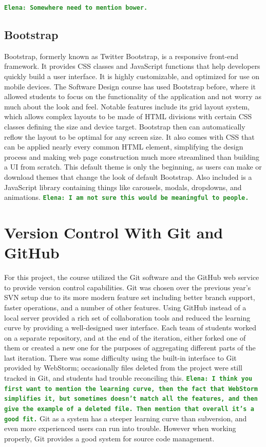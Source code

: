 \documentclass[12pt]{article}
\newcommand{\comment}[1]{{\bf \tt  {#1}}}
\newcommand{\emcomment}[1]{\textcolor{ForestGreen}{\comment{Elena: {#1}}}}
\begin{document}
\emcomment{Somewhere need to mention bower.}

\subsection{Bootstrap}\label{sec:bootstrap}
Bootstrap, formerly known as Twitter Bootstrap, is a responsive front-end framework. It provides CSS classes and JavaScript functions that help developers quickly build a user interface. It is highly customizable, and optimized for use on mobile devices. The Software Design course has used Bootstrap before, where it allowed students to focus on the functionality of the application and not worry as much about the look and feel. Notable features include its grid layout system, which allows complex layouts to be made of HTML divisions with certain CSS classes defining the size and device target. Bootstrap then can automatically reflow the layout to be optimal for any screen size. It also comes with CSS that can be applied nearly every common HTML element, simplifying the design process and making web page construction much more streamlined than building a UI from scratch. This default theme is only the beginning, as users can make or download themes that change the look of default Bootstrap. Also included is a JavaScript library containing things like carousels, modals, dropdowns, and animations. \emcomment{I am not sure this would be meaningful to people.}

\section{Version Control With Git and GitHub}\label{sec:git}
For this project, the course utilized the Git software and the GitHub web service to provide version control capabilities. Git was chosen over the previous year's SVN setup due to its more modern feature set including better branch support, faster operations, and a number of other features. Using GitHub instead of a local server provided a rich set of collaboration tools and reduced the learning curve by providing a well-designed user interface. Each team of students worked on a separate repository, and at the end of the iteration, either forked one of them or created a new one for the purposes of aggregating different parts of the last iteration. There was some difficulty using the built-in interface to Git provided by WebStorm; occasionally files deleted from the project were still tracked in Git, and students had trouble reconciling this. \emcomment{I think you first want to mention the learning curve, then the fact that WebStorm simplifies it, but sometimes doesn't match all the features, and then give the example of a deleted file. Then mention that overall it's a good fit.} Git as a system has a steeper learning curve than subversion, and even more experienced users can run into trouble. However when working properly, Git provides a good system for source code management.
\end{document}
